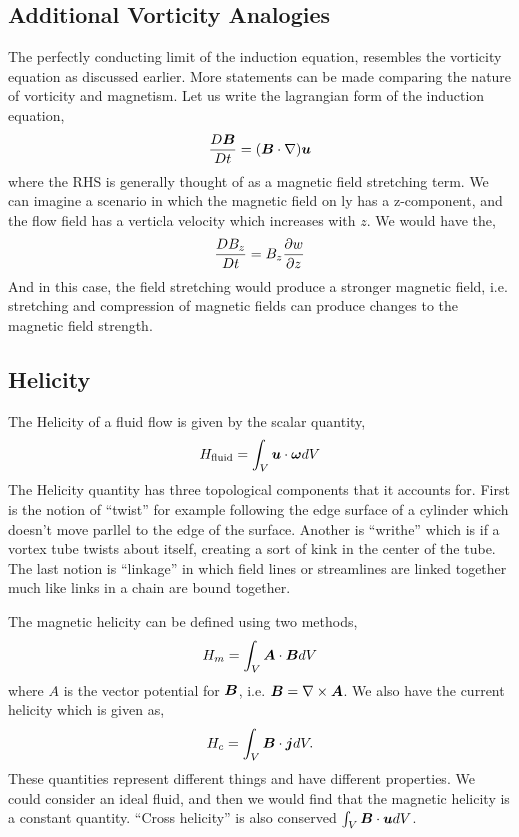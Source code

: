 \documentclass{article}
\begin{document}
\subsection{Additional Vorticity Analogies}
The perfectly conducting limit of the induction equation, resembles the
vorticity equation as discussed earlier. More statements can be made comparing
the nature of vorticity and magnetism. Let us write the lagrangian form of the
induction equation, 
\begin{gather*}
    \frac{D \boldsymbol{B}}{D t} = (\boldsymbol{B}\cdot\nabla)\boldsymbol{u}
\end{gather*}
where the RHS is generally thought of as a magnetic field stretching term. We
can imagine a scenario in which the magnetic field on ly has a z-component, and
the flow field has a verticla velocity which increases with $z$. We would have
the, 
\begin{gather*}
    \frac{D B_z}{D t} = B_z\frac{\partial w}{\partial z}
\end{gather*}
And in this case, the field stretching would produce a stronger magnetic field,
i.e. stretching and compression of magnetic fields can produce changes to the
magnetic field strength. 

\subsection{Helicity}
The Helicity of a fluid flow is given by the scalar quantity, 
\begin{gather*}
H_{\text{fluid}} = \int_V \boldsymbol{u}\cdot\boldsymbol{\omega} dV
\end{gather*}
The Helicity quantity has three topological components that it accounts for.
First is the notion of ``twist'' for example following the edge surface of a
cylinder which doesn't move parllel to the edge of the surface. Another is
``writhe'' which is if a vortex tube twists about itself, creating a sort of
kink in the center of the tube. The last notion is ``linkage'' in which field
lines or streamlines are linked together much like links in a chain are bound
together. 

The magnetic helicity can be defined using two methods, 
\begin{gather*}
    H_m = \int_V \boldsymbol{A}\cdot\boldsymbol{B} dV
\end{gather*}
where $A$ is the vector potential for $\boldsymbol{B}$, i.e. $\boldsymbol{B} = \nabla\times\boldsymbol{A}$. 
We also have the current helicity which is given as, 
\begin{gather*}
    H_c = \int_V \boldsymbol{B} \cdot \boldsymbol{j} dV. 
\end{gather*}
These quantities represent different things and have different properties. We
could consider an ideal fluid, and then we would find that the magnetic helicity
is a constant quantity. ``Cross helicity'' is also conserved $\int_V \boldsymbol{B} \cdot\boldsymbol{u} dV$. 
\end{document}
